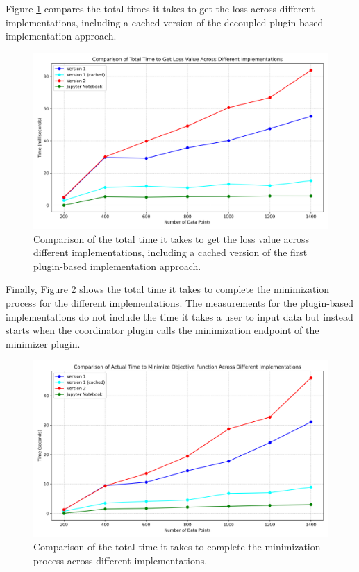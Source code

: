 \documentclass[
  a4paper,  %
  twoside,  %
  bibliography=totoc,
  headsepline,
  cleardoublepage=empty,
  parskip=half,
  draft=false
]{scrbook}
\begin{document}
Figure \ref{fig:coparison_of_of_cached} compares the total times it takes to get the loss across different implementations, including a cached version of the decoupled plugin-based implementation approach.

\begin{figure}
  \centering
  \includegraphics[width=\textwidth]{graphics/comparison_of_of_cached.png}
  \caption[Total times to get loss value compared including cached approach]{Comparison of the total time it takes to get the loss value across different implementations, including a cached version of the first plugin-based implementation approach.}
  \label{fig:coparison_of_of_cached}
\end{figure}

Finally, Figure \ref{fig:time_for_minimization} shows the total time it takes to complete the minimization process for the different implementations.
The measurements for the plugin-based implementations do not include the time it takes a user to input data but instead starts when the coordinator plugin calls the minimization endpoint of the minimizer plugin.

\begin{figure}
  \centering
  \includegraphics[width=\textwidth]{graphics/time_for_minimization.png}
  \caption[Times to minimize a loss function compared]{Comparison of the total time it takes to complete the minimization process across different implementations.}
  \label{fig:time_for_minimization}
\end{figure}
\end{document}
